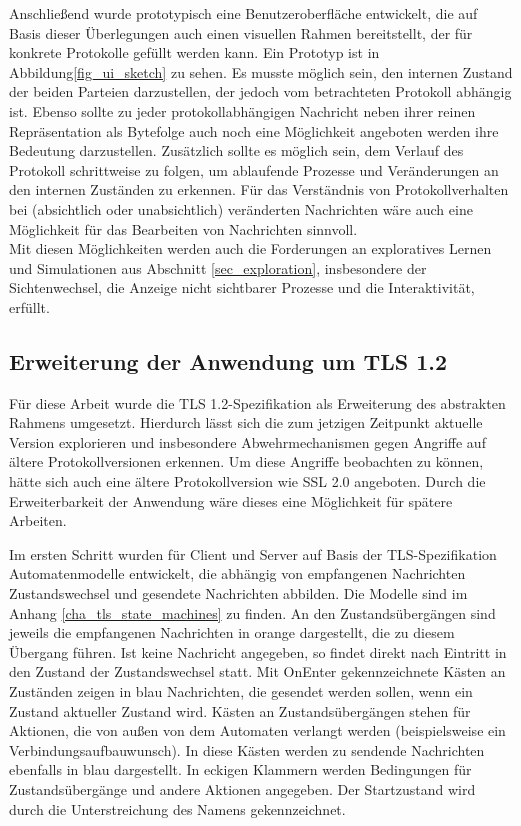 Anschließend wurde prototypisch eine Benutzeroberfläche entwickelt, die auf Basis dieser Überlegungen auch einen visuellen Rahmen bereitstellt, der für konkrete Protokolle gefüllt werden kann. Ein Prototyp ist in Abbildung\ref{fig_ui_sketch} zu sehen. Es musste möglich sein, den internen Zustand der beiden Parteien darzustellen, der jedoch vom betrachteten Protokoll abhängig ist. Ebenso sollte zu jeder protokollabhängigen Nachricht neben ihrer reinen Repräsentation als Bytefolge auch noch eine Möglichkeit angeboten werden ihre Bedeutung darzustellen. Zusätzlich sollte es möglich sein, dem Verlauf des Protokoll schrittweise zu folgen, um ablaufende Prozesse und Veränderungen an den internen Zuständen zu erkennen. Für das Verständnis von Protokollverhalten bei (absichtlich oder unabsichtlich) veränderten Nachrichten wäre auch eine Möglichkeit für das Bearbeiten von Nachrichten sinnvoll.\\
Mit diesen Möglichkeiten werden auch die Forderungen an exploratives Lernen und Simulationen aus Abschnitt \ref{sec_exploration}, insbesondere der Sichtenwechsel, die Anzeige nicht sichtbarer Prozesse und die Interaktivität, erfüllt.

\subsection{Erweiterung der Anwendung um TLS 1.2}
\label{sec_analysis_tls_plugin}

Für diese Arbeit wurde die TLS 1.2-Spezifikation als Erweiterung des abstrakten Rahmens umgesetzt. Hierdurch lässt sich die zum jetzigen Zeitpunkt aktuelle Version explorieren und insbesondere Abwehrmechanismen gegen Angriffe auf ältere Protokollversionen erkennen. Um diese Angriffe beobachten zu können, hätte sich auch eine ältere Protokollversion wie SSL 2.0 angeboten. Durch die Erweiterbarkeit der Anwendung wäre dieses eine Möglichkeit für spätere Arbeiten.

Im ersten Schritt wurden für Client und Server auf Basis der TLS-Spezifikation Automatenmodelle entwickelt, die abhängig von empfangenen Nachrichten Zustandswechsel und gesendete Nachrichten abbilden. Die Modelle sind im Anhang \ref{cha_tls_state_machines} zu finden. An den Zustandsübergängen sind jeweils die empfangenen Nachrichten in orange dargestellt, die zu diesem Übergang führen. Ist keine Nachricht angegeben, so findet direkt nach Eintritt in den Zustand der Zustandswechsel statt. Mit OnEnter gekennzeichnete Kästen an Zuständen zeigen in blau Nachrichten, die gesendet werden sollen, wenn ein Zustand aktueller Zustand wird. Kästen an Zustandsübergängen stehen für Aktionen, die von außen von dem Automaten verlangt werden (beispielsweise ein Verbindungsaufbauwunsch). In diese Kästen werden zu sendende Nachrichten ebenfalls in blau dargestellt. In eckigen Klammern werden Bedingungen für Zustandsübergänge und andere Aktionen angegeben. Der Startzustand wird durch die Unterstreichung des Namens gekennzeichnet.
 
